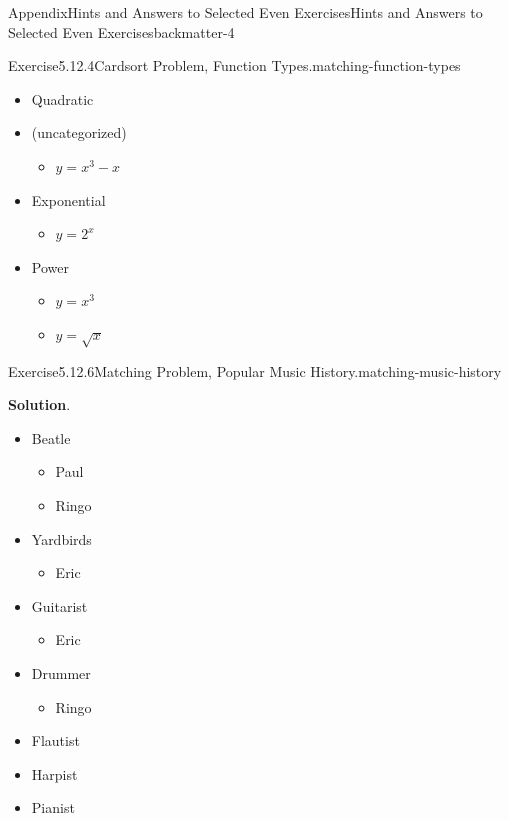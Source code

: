 \documentclass[oneside,10pt,]{book}
\newcommand{\blocktitlefont}{\relax}
\numberwithin{equation}{section}
\begin{document}
\begin{solutions-chapter}{Appendix}{Hints and Answers to Selected Even Exercises}{}{Hints and Answers to Selected Even Exercises}{}{}{backmatter-4}
\begin{divisionsolution}{Exercise}{5.12.4}{Cardsort Problem, Function Types.}{matching-function-types}
\begin{itemize}[label=\textbullet]
\begin{itemize}[label=$\circ$]
\end{itemize}
%
\item{}Quadratic%
\item{}(uncategorized)%
\begin{itemize}[label=$\circ$]
\item{}\(y=x^3-x\)%
\end{itemize}
%
\item{}Exponential%
\begin{itemize}[label=$\circ$]
\item{}\(y=2^x\)%
\end{itemize}
%
\item{}Power%
\begin{itemize}[label=$\circ$]
\item{}\(y=x^3\)%
\item{}\(y=\sqrt{x}\)%
\end{itemize}
%
\end{itemize}
%
\end{divisionsolution}%
\begin{divisionsolution}{Exercise}{5.12.6}{Matching Problem, Popular Music History.}{matching-music-history}%
\par\smallskip%
\noindent\textbf{\blocktitlefont Solution}.\hypertarget{matching-music-history-4-back}{}\quad{}%
\begin{itemize}[label=\textbullet]
\item{}Beatle%
\begin{itemize}[label=$\circ$]
\item{}Paul%
\item{}Ringo%
\end{itemize}
%
\item{}Yardbirds%
\begin{itemize}[label=$\circ$]
\item{}Eric%
\end{itemize}
%
\item{}Guitarist%
\begin{itemize}[label=$\circ$]
\item{}Eric%
\end{itemize}
%
\item{}Drummer%
\begin{itemize}[label=$\circ$]
\item{}Ringo%
\end{itemize}
%
\item{}Flautist%
\item{}Harpist%
\item{}Pianist%
\begin{itemize}[label=$\circ$]

\end{itemize}
\end{itemize}
\end{divisionsolution}
\end{solutions-chapter}
\end{document}
